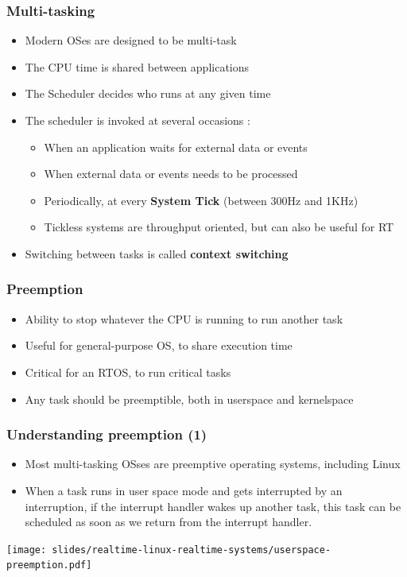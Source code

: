\begin{frame}
  \frametitle{Multi-tasking}
	\begin{itemize}
		\item Modern OSes are designed to be multi-task
		\item The CPU time is shared between applications
		\item The Scheduler decides who runs at any given time
		\item The scheduler is invoked at several occasions :
			\begin{itemize}
				\item When an application waits for external data or events
				\item When external data or events needs to be processed
				\item Periodically, at every \textbf{System Tick} (between 300Hz and 1KHz)
				\item Tickless systems are throughput oriented, but can also be useful for RT
			\end{itemize}
		\item Switching between tasks is called \textbf{context switching}
	\end{itemize}
\end{frame}

\begin{frame}
	\frametitle{Preemption}
	\begin{itemize}
		\item Ability to stop whatever the CPU is running to run another task
		\item Useful for general-purpose OS, to share execution time
		\item Critical for an RTOS, to run critical tasks
		\item Any task should be preemptible, both in userspace and kernelspace
	\end{itemize}
\end{frame}

\begin{frame}
  \frametitle{Understanding preemption (1)}
  \begin{itemize}
  \item Most multi-tasking OSses are preemptive operating systems, including Linux
  \item When a task runs in user space mode and gets interrupted by an
    interruption, if the interrupt handler wakes up another task, this
    task can be scheduled as soon as we return from the interrupt
    handler.
  \end{itemize}
  \begin{center}
    \texttt{[image: slides/realtime-linux-realtime-systems/userspace-preemption.pdf]}
  \end{center}
\end{frame}

